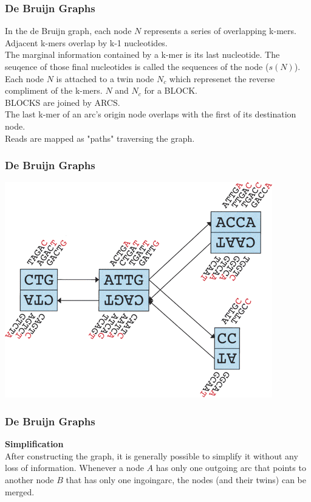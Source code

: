 \documentclass[pdf]{beamer}
\begin{document}
\begin{frame}
\frametitle{De Bruijn Graphs}
In the de Bruijn graph, each node $N$ represents a series of overlapping k-mers. Adjacent k-mers overlap by k-1 nucleotides.\\
\vspace{0.2in}
The marginal information contained by a k-mer is its last nucleotide. The seuqence of those final nucleotides is called the sequences of the node ($s(N)$). Each node $N$ is attached to a twin node $N_c$ which represenet the reverse compliment of the k-mers. $N$ and $N_c$ for a BLOCK.\\
\vspace{0.2in}
BLOCKS are joined by ARCS.\\
The last k-mer of an arc's origin node overlaps with the first of its destination node.\\
Reads are mapped as "paths" traversing the graph.
\end{frame}

\begin{frame}
\frametitle{De Bruijn Graphs}
\begin{center}
\includegraphics[scale=0.5]{Figures/velvet_blocks.png} 
\end{center}
\end{frame}

\begin{frame}
\frametitle{De Bruijn Graphs}
\textbf{Simplification}\\
After constructing the graph, it is generally possible to simplify it without any loss of information. Whenever a node $A$ has only one outgoing arc that points to another node $B$ that has only one ingoingarc, the nodes (and their twins) can be merged.
\end{frame}
\end{document}
